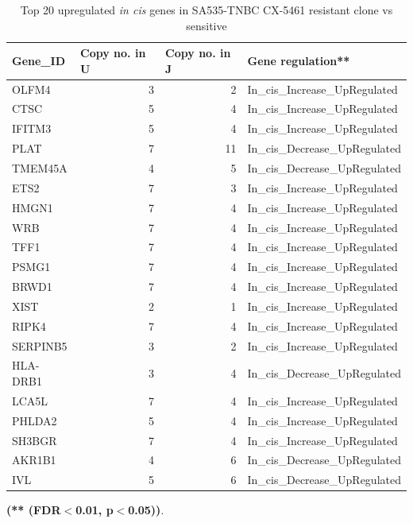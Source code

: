  \begin{table}[htbp]
   \centering
   \caption{Top 20 upregulated \textit{in cis} genes in SA535-TNBC CX-5461 resistant clone vs sensitive}
     \begin{tabular}{|l|r|r|l|}
     \hline
     \textbf{Gene\_ID} & \multicolumn{1}{|l|}{\textbf{Copy no. in  U} }& \multicolumn{1}{|l|}{\textbf{Copy no. in  J}} & \textbf{Gene regulation**} \\
     \hline
     OLFM4 & 3 & 2 & In\_cis\_Increase\_UpRegulated \\
     CTSC & 5 & 4 & In\_cis\_Increase\_UpRegulated \\
     IFITM3 & 5 & 4 & In\_cis\_Increase\_UpRegulated \\
     PLAT & 7 & 11 & In\_cis\_Decrease\_UpRegulated \\
     TMEM45A & 4 & 5 & In\_cis\_Decrease\_UpRegulated \\
     ETS2 & 7 & 3 & In\_cis\_Increase\_UpRegulated \\
     HMGN1 & 7 & 4 & In\_cis\_Increase\_UpRegulated \\
     WRB & 7 & 4 & In\_cis\_Increase\_UpRegulated \\
     TFF1 & 7 & 4 & In\_cis\_Increase\_UpRegulated \\
     PSMG1 & 7 & 4 & In\_cis\_Increase\_UpRegulated \\
     BRWD1 & 7 & 4 & In\_cis\_Increase\_UpRegulated \\
     XIST & 2 & 1 & In\_cis\_Increase\_UpRegulated \\
     RIPK4 & 7 & 4 & In\_cis\_Increase\_UpRegulated \\
     SERPINB5 & 3 & 2 & In\_cis\_Increase\_UpRegulated \\
     HLA-DRB1 & 3 & 4 & In\_cis\_Decrease\_UpRegulated \\
     LCA5L & 7 & 4 & In\_cis\_Increase\_UpRegulated \\
     PHLDA2 & 5 & 4 & In\_cis\_Increase\_UpRegulated \\
     SH3BGR & 7 & 4 & In\_cis\_Increase\_UpRegulated \\
     AKR1B1 & 4 & 6 & In\_cis\_Decrease\_UpRegulated \\
     IVL & 5 & 6 & In\_cis\_Decrease\_UpRegulated \\
     \hline
     \end{tabular}%
   \label{tab:top20SA535upregulatedCX}%
 
  \small\textbf{(** (FDR$<$0.01, p$<$0.05))}.

 \end{table}%





